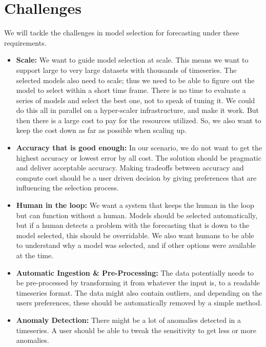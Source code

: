 \section{Challenges}

We will tackle the challenges in model selection for forecasting under these requirements.

\begin{itemize}
    \item \textbf{Scale:} We want to guide model selection at scale. This means we want to support large to very large datasets with thousands of timeseries. The selected models also need to scale; thus we need to be able to figure out the model to select within a short time frame. There is no time to evaluate a series of models and select the best one, not to speak of tuning it. We could do this all in parallel on a hyper-scaler infrastructure, and make it work. But then there is a large cost to pay for the resources utilized. So, we also want to keep the cost down as far as possible when scaling up.
    \item \textbf{Accuracy that is good enough:} In our scenario, we do not want to get the highest accuracy or lowest error by all cost. The solution should be pragmatic and deliver acceptable accuracy. Making tradeoffs between accuracy and compute cost should be a user driven decision by giving preferences that are influencing the selection process.
    \item \textbf{Human in the loop:} We want a system that keeps the human in the loop but can function without a human. Models should be selected automatically, but if a human detects a problem with the forecasting that is down to the model selected, this should be overridable. We also want humans to be able to understand why a model was selected, and if other options were available at the time.
    \item \textbf{Automatic Ingestion \& Pre-Processing:} The data potentially needs to be pre-processed by transforming it from whatever the input is, to a readable timeseries format. The data might also contain outliers, and depending on the users preferences, these should be automatically removed by a simple method.
    \item \textbf{Anomaly Detection:} There might be a lot of anomalies detected in a timeseries. A user should be able to tweak the sensitivity to get less or more anomalies.
\end{itemize}
